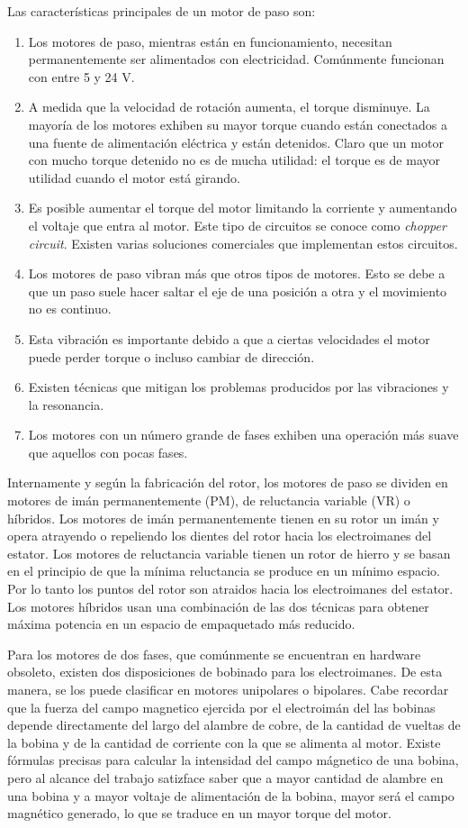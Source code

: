 \documentclass[final,narroweqnarray,inline,twoside]{ieee}
\begin{document}
Las características principales de un motor de paso son:
\begin{enumerate}
 \item Los motores de paso, mientras están en funcionamiento, necesitan permanentemente ser alimentados con electricidad.
Comúnmente funcionan con entre 5 y 24 V.
 \item A medida que la velocidad de rotación aumenta, el torque disminuye. La mayoría de los motores exhiben su mayor torque
cuando están conectados a una fuente de alimentación eléctrica y están detenidos. Claro que un motor con mucho torque
detenido no es de mucha utilidad: el torque es de mayor utilidad cuando el motor está girando.
 \item Es posible aumentar el torque del motor limitando la corriente y aumentando el voltaje que entra al motor. Este tipo
de circuitos se conoce como \textit{chopper circuit}. Existen varias soluciones comerciales que implementan estos circuitos.
 \item Los motores de paso vibran más que otros tipos de motores. Esto se debe a que un paso suele hacer saltar el eje de
una posición a otra y el movimiento no es continuo.
 \item Esta vibración es importante debido a que a ciertas velocidades el motor puede perder torque o incluso cambiar de
dirección.
 \item Existen técnicas que mitigan los problemas producidos por las vibraciones y la resonancia.
 \item Los motores con un número grande de fases exhiben una operación más suave que aquellos con pocas fases.
\end{enumerate}
Internamente y según la fabricación del rotor, los motores de paso se dividen en motores de imán permanentemente (PM), de
reluctancia variable (VR) o híbridos. Los motores de imán permanentemente tienen en su rotor un imán y opera atrayendo o
repeliendo los dientes del rotor hacia los electroimanes del estator. Los motores de reluctancia variable tienen un rotor de
hierro y se basan en el principio de que la mínima reluctancia se produce en un mínimo espacio. Por lo tanto los puntos del
rotor son atraidos hacia los electroimanes del estator. Los motores híbridos usan una combinación de las dos técnicas para
obtener máxima potencia en un espacio de empaquetado más reducido.

Para los motores de dos fases, que comúnmente se encuentran en hardware obsoleto, existen dos disposiciones de bobinado para
los electroimanes. De esta manera, se los puede clasificar en motores unipolares o bipolares. Cabe recordar que la fuerza
del campo magnetico ejercida por el electroimán del las bobinas depende directamente del largo del alambre de cobre, de la
cantidad de vueltas de la bobina y de la cantidad de corriente con la que se alimenta al motor.
Existe fórmulas precisas para calcular la intensidad del campo mágnetico de una bobina, pero al alcance del trabajo
satizface saber que a mayor cantidad de alambre en una bobina y a mayor voltaje de alimentación de la bobina,
mayor será el campo magnético generado, lo que se traduce en un mayor torque del motor.
\end{document}
